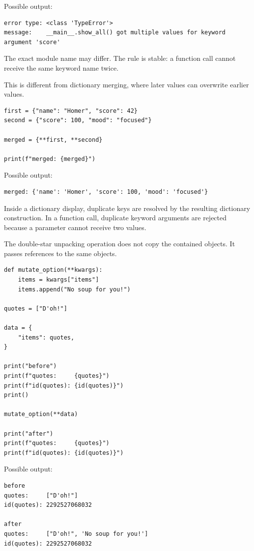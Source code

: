 Possible output:

\begin{verbatim}
error type: <class 'TypeError'>
message:    __main__.show_all() got multiple values for keyword argument 'score'
\end{verbatim}

The exact module name may differ. The rule is stable: a function call cannot receive the same keyword name twice.

This is different from dictionary merging, where later values can overwrite earlier values.

\begin{verbatim}
first = {"name": "Homer", "score": 42}
second = {"score": 100, "mood": "focused"}

merged = {**first, **second}

print(f"merged: {merged}")
\end{verbatim}

Possible output:

\begin{verbatim}
merged: {'name': 'Homer', 'score': 100, 'mood': 'focused'}
\end{verbatim}

Inside a dictionary display, duplicate keys are resolved by the resulting dictionary construction. In a function call, duplicate keyword arguments are rejected because a parameter cannot receive two values.

The double-star unpacking operation does not copy the contained objects. It passes references to the same objects.

\begin{verbatim}
def mutate_option(**kwargs):
    items = kwargs["items"]
    items.append("No soup for you!")

quotes = ["D'oh!"]

data = {
    "items": quotes,
}

print("before")
print(f"quotes:     {quotes}")
print(f"id(quotes): {id(quotes)}")
print()

mutate_option(**data)

print("after")
print(f"quotes:     {quotes}")
print(f"id(quotes): {id(quotes)}")
\end{verbatim}

Possible output:

\begin{verbatim}
before
quotes:     ["D'oh!"]
id(quotes): 2292527068032

after
quotes:     ["D'oh!", 'No soup for you!']
id(quotes): 2292527068032
\end{verbatim}

